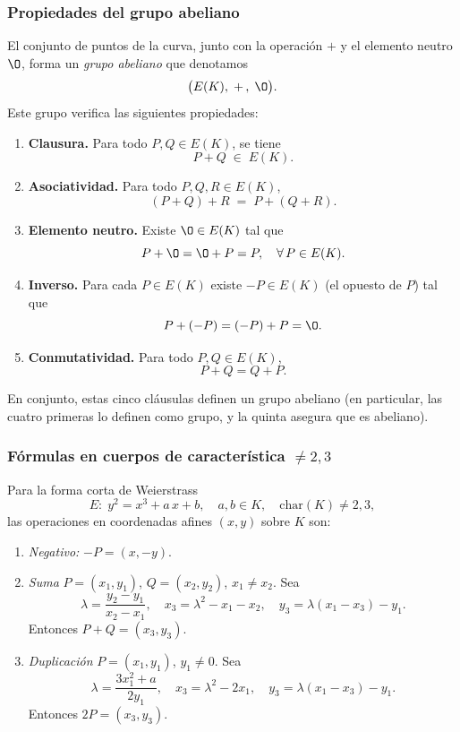 \subsubsection*{Propiedades del grupo abeliano}
El conjunto de puntos de la curva, junto con la operación $+$ y el elemento neutro $\O$, forma un \emph{grupo abeliano} que denotamos
\[
  \bigl(E(K),\;+\,,\;\O\bigr).
\]
Este grupo verifica las siguientes propiedades:

\begin{enumerate}
  \item \textbf{Clausura.} Para todo $P,Q\in E(K)$, se tiene
    \[
      P + Q \;\in\; E(K).
    \]
  \item \textbf{Asociatividad.} Para todo $P,Q,R\in E(K)$,
    \[
      (P + Q) + R \;=\; P + (Q + R).
    \]
  \item \textbf{Elemento neutro.} Existe $\O\in E(K)$ tal que
    \[
      P + \O = \O + P = P,
      \quad \forall\,P\in E(K).
    \]
  \item \textbf{Inverso.} Para cada $P\in E(K)$ existe $-P\in E(K)$ (el opuesto de $P$)
    tal que
    \[
      P + (-P) = (-P) + P = \O.
    \]
  \item \textbf{Conmutatividad.} Para todo $P,Q\in E(K)$,
    \[
      P + Q = Q + P.
    \]
\end{enumerate}

\noindent En conjunto, estas cinco cláusulas definen un grupo abeliano (en particular, las cuatro primeras lo definen como grupo, y la quinta asegura que es abeliano).

\subsubsection*{Fórmulas en cuerpos de característica \(\neq2,3\)}

Para la forma corta de Weierstrass
\[
  E\colon\;y^2 = x^3 + a\,x + b,
  \quad a,b\in K,
  \quad \mathrm{char}(K)\neq2,3,
\]
las operaciones en coordenadas afines \((x,y)\) sobre \(K\) son:

\begin{enumerate}
  \item \emph{Negativo:} \(-P = (x,-y)\).
  \item \emph{Suma} \(P=(x_1,y_1)\), \(Q=(x_2,y_2)\), \(x_1\neq x_2\). Sea
    \[
      \lambda = \frac{y_2 - y_1}{x_2 - x_1}, 
      \quad
      x_3 = \lambda^2 - x_1 - x_2,\quad
      y_3 = \lambda(x_1 - x_3) - y_1.
    \]
    Entonces \(P + Q = (x_3,y_3)\).
  \item \emph{Duplicación} \(P=(x_1,y_1)\), \(y_1\neq0\). Sea
    \[
      \lambda = \frac{3x_1^2 + a}{2y_1}, 
      \quad
      x_3 = \lambda^2 - 2x_1,\quad
      y_3 = \lambda(x_1 - x_3) - y_1.
    \]
    Entonces \(2P = (x_3,y_3)\).
\end{enumerate}

